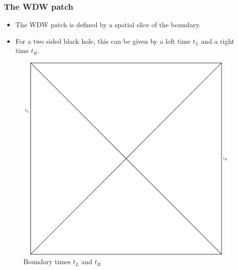 \documentclass[8pt,aspectratio=169]{beamer}
\begin{document}
\begin{frame}
\frametitle{The WDW patch}

\begin{minipage}[t]{0.55\linewidth}

\begin{itemize}

\item The WDW patch is defined by a spatial slice of the boundary. 

\item For a two sided black hole, this can be given by a left time $t_L$ and a right time $t_R$.

\end{itemize}

\end{minipage}\hfill
%
\begin{minipage}[t]{0.44\linewidth}

\begin{figure}
    \begin{center}
    
        \includegraphics[scale=0.4]{WDW0.pdf}    
    
    \end{center}
    \caption{Boundary times $t_L$ and $t_R$}
    \label{fig:WDW}
\end{figure}

\end{minipage}

\end{frame}
\end{document}
